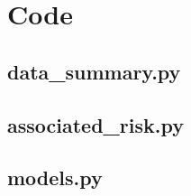 \documentclass[journal,12pt,onecolumn]{IEEEtran} %
\begin{document}
\section{Code}\label{sec:code}

\subsection{data\_summary.py}\label{subsec:data_summary.py}


\clearpage

\subsection{associated\_risk.py}\label{subsec:associated_risk.py}


\clearpage

\subsection{models.py}\label{subsec:models.py}

\end{document}

